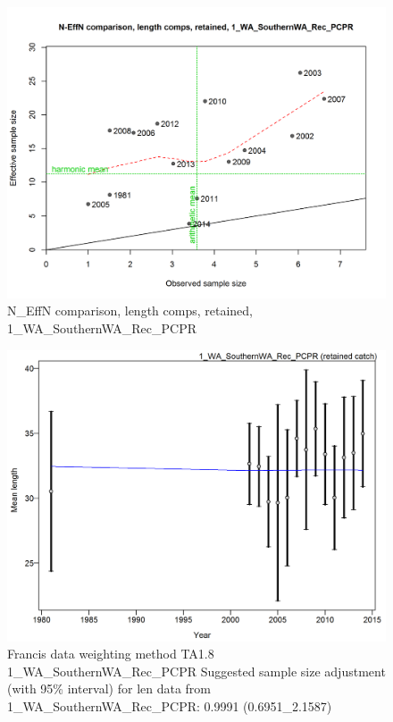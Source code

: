 \documentclass[12pt,]{article}
\begin{document}
\begin{figure}[htbp]
\centering
\includegraphics{./r4ss/plots_mod1/comp_lenfit_sampsize_flt1mkt2.png}
\caption{N\_EffN comparison, length comps, retained,
1\_WA\_SouthernWA\_Rec\_PCPR
\label{fig:mod1_3_comp_lenfit_sampsize_flt1mkt2}}
\end{figure}

\begin{figure}[htbp]
\centering
\includegraphics{./r4ss/plots_mod1/comp_lenfit_data_weighting_TA1.8_1_WA_SouthernWA_Rec_PCPR.png}
\caption{Francis data weighting method TA1.8
1\_WA\_SouthernWA\_Rec\_PCPR Suggested sample size adjustment (with 95\%
interval) for len data from 1\_WA\_SouthernWA\_Rec\_PCPR: 0.9991
(0.6951\_2.1587)
\label{fig:mod1_4_comp_lenfit_data_weighting_TA1.8_1_WA_SouthernWA_Rec_PCPR}}
\end{figure}
\end{document}
